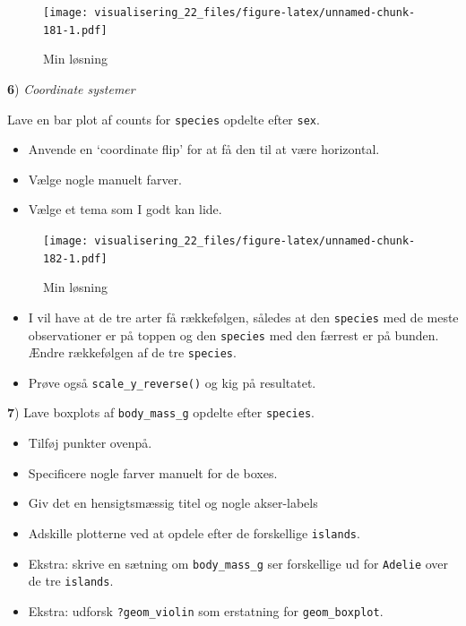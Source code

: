 \documentclass[
]{book}
\providecommand{\tightlist}{%
  \setlength{\itemsep}{0pt}\setlength{\parskip}{0pt}}
\begin{document}
\begin{figure}
\centering
\texttt{[image: visualisering\_22\_files/figure-latex/unnamed-chunk-181-1.pdf]}
\caption{\label{fig:unnamed-chunk-181}Min løsning}
\end{figure}

\textbf{6}) \emph{Coordinate systemer}

Lave en bar plot af counts for \texttt{species} opdelte efter \texttt{sex}.

\begin{itemize}
\tightlist
\item
  Anvende en `coordinate flip' for at få den til at være horizontal.
\item
  Vælge nogle manuelt farver.
\item
  Vælge et tema som I godt kan lide.
\end{itemize}

\begin{figure}
\centering
\texttt{[image: visualisering\_22\_files/figure-latex/unnamed-chunk-182-1.pdf]}
\caption{\label{fig:unnamed-chunk-182}Min løsning}
\end{figure}

\begin{itemize}
\tightlist
\item
  I vil have at de tre arter få rækkefølgen, således at den \texttt{species} med de meste observationer er på toppen og den \texttt{species} med den færrest er på bunden. Ændre rækkefølgen af de tre \texttt{species}.
\item
  Prøve også \texttt{scale\_y\_reverse()} og kig på resultatet.
\end{itemize}

\textbf{7}) Lave boxplots af \texttt{body\_mass\_g} opdelte efter \texttt{species}.

\begin{itemize}
\item
  Tilføj punkter ovenpå.
\item
  Specificere nogle farver manuelt for de boxes.
\item
  Giv det en hensigtsmæssig titel og nogle akser-labels
\item
  Adskille plotterne ved at opdele efter de forskellige \texttt{islands}.
\item
  Ekstra: skrive en sætning om \texttt{body\_mass\_g} ser forskellige ud for \texttt{Adelie} over de tre \texttt{islands}.
\item
  Ekstra: udforsk \texttt{?geom\_violin} som erstatning for \texttt{geom\_boxplot}.
\end{itemize}
\end{document}
